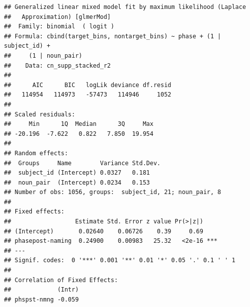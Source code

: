 \documentclass[
  doc,floatsintext]{apa6}
\begin{document}
\begin{verbatim}
## Generalized linear mixed model fit by maximum likelihood (Laplace
##   Approximation) [glmerMod]
##  Family: binomial  ( logit )
## Formula: cbind(target_bins, nontarget_bins) ~ phase + (1 | subject_id) +  
##     (1 | noun_pair)
##    Data: cn_supp_stacked_r2
## 
##      AIC      BIC   logLik deviance df.resid 
##   114954   114973   -57473   114946     1052 
## 
## Scaled residuals: 
##     Min      1Q  Median      3Q     Max 
## -20.196  -7.622   0.822   7.850  19.954 
## 
## Random effects:
##  Groups     Name        Variance Std.Dev.
##  subject_id (Intercept) 0.0327   0.181   
##  noun_pair  (Intercept) 0.0234   0.153   
## Number of obs: 1056, groups:  subject_id, 21; noun_pair, 8
## 
## Fixed effects:
##                  Estimate Std. Error z value Pr(>|z|)    
## (Intercept)       0.02640    0.06726    0.39     0.69    
## phasepost-naming  0.24900    0.00983   25.32   <2e-16 ***
## ---
## Signif. codes:  0 '***' 0.001 '**' 0.01 '*' 0.05 '.' 0.1 ' ' 1
## 
## Correlation of Fixed Effects:
##             (Intr)
## phspst-nmng -0.059
\end{verbatim}
\end{document}
